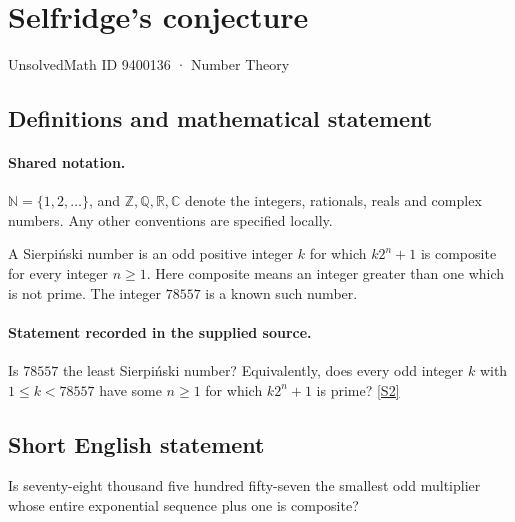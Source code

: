 \documentclass[11pt]{article}
\newcommand{\sref}[2]{\hyperlink{source:#1:#2}{[S#2]}}
\begin{document}
\setcounter{section}{9400135}
\section{Selfridge's conjecture}\label{9400136}
{\small\sffamily UnsolvedMath ID 9400136 · Number Theory}
\subsection{Definitions and mathematical statement}

\paragraph{Shared notation.}$\mathbb N=\{1,2,\ldots\}$, and $\mathbb Z,\mathbb Q,\mathbb R,\mathbb C$ denote the integers, rationals, reals and complex numbers. Any other conventions are specified locally.


A Sierpi\'nski number is an odd positive integer $k$ for which $k2^n+1$ is composite for every integer $n\ge1$. Here composite means an integer greater than one which is not prime. The integer $78557$ is a known such number.
\paragraph{Statement recorded in the supplied source.}
Is $78557$ the least Sierpi\'nski number? Equivalently, does every odd integer $k$ with $1\le k<78557$ have some $n\ge1$ for which $k2^n+1$ is prime? \sref{9400136}{2}
\subsection{Short English statement}
Is seventy-eight thousand five hundred fifty-seven the smallest odd multiplier whose entire exponential sequence plus one is composite?
\end{document}
